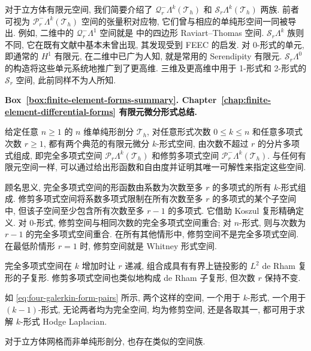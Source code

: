 对于立方体有限元空间, 我们简要介绍了 $\mathcal Q_r^-\Lambda^k(\mathcal T_h)$ 和 $\mathcal S_r\Lambda^k(\mathcal T_h)$ 两族. 前者可视为 $\mathcal P_r^-\Lambda^k(\mathcal T_h)$ 空间的张量积对应物, 它们曾与相应的单纯形空间一同被导出. 例如, 二维中的 $\mathcal Q_r^-\Lambda^1$ 空间就是  中的四边形 Raviart–Thomas 空间. $\mathcal S_r\Lambda^k$ 族则不同, 它在既有文献中基本未曾出现, 其发现受到 FEEC 的启发. 对 0-形式的单元, 即通常的 $H^1$ 有限元, 在二维中已广为人知, 就是常用的 Serendipity 有限元. $\mathcal S_r\Lambda^0$ 的构造将这些单元系统地推广到了更高维. 三维及更高维中用于 1-形式和 2-形式的 $\mathcal S_r$ 空间, 此前同样不为人所知.
\newpage
{}\label{box:finite-element-forms-summary}
\begin{MBSourceBox}
\textbf{Box~\ref{box:finite-element-forms-summary}. {Chapter~\ref{chap:finite-element-differential-forms} 有限元微分形式总结.}}

给定任意 $n\geq1$ 的 $n$ 维单纯形剖分 $\mathcal T_h$, 对任意形式次数 $0\leq k\leq n$ 和任意多项式次数 $r\geq1$, 都有两个典范的有限元微分 $k$-形式空间, 由次数不超过 $r$ 的分片多项式组成, 即完全多项式空间 $\mathcal P_r\Lambda^k(\mathcal T_h)$ 和修剪多项式空间 $\mathcal P_r^-\Lambda^k(\mathcal T_h)$. 与任何有限元空间一样, 可以通过给出形函数和自由度并证明其唯一可解性来指定这些空间.

顾名思义, 完全多项式空间的形函数由系数为次数至多 $r$ 的多项式的所有 $k$-形式组成. 修剪多项式空间将系数多项式限制在所有次数至多 $r$ 的多项式的某个子空间中, 但该子空间至少包含所有次数至多 $r-1$ 的多项式. 它借助 Koszul 复形精确定义. 对 0-形式, 修剪空间与相同次数的完全多项式空间重合; 对 $n$-形式, 则与次数为 $r-1$ 的完全多项式空间重合. 在所有其他情形中, 修剪空间不是完全多项式空间. 在最低阶情形 $r=1$ 时, 修剪空间就是 Whitney 形式空间.

完全多项式空间在 $k$ 增加时让 $r$ 递减, 组合成具有有界上链投影的 $L^2$ de Rham 复形的子复形. 修剪多项式空间也类似地构成 de Rham 子复形, 但次数 $r$ 保持不变.

如 \eqref{eq:four-galerkin-form-pairs} 所示, 两个这样的空间, 一个用于 $k$-形式, 一个用于 $(k-1)$-形式, 无论两者均为完全空间, 均为修剪空间, 还是各取其一, 都可用于求解 $k$-形式 Hodge Laplacian.

对于立方体网格而非单纯形剖分, 也存在类似的空间族.
\end{MBSourceBox}
\par\endgroup
